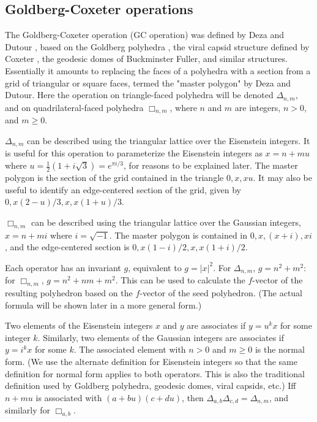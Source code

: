 \documentclass[12pt]{amsart}%
\begin{document}
\subsection{Goldberg-Coxeter operations}
The Goldberg-Coxeter operation (GC operation) was defined by Deza and Dutour
\cite{dutour}\cite{deza}, based on the Goldberg polyhedra
\cite{goldberg}\cite{hart13}, the viral capsid structure defined by Coxeter
\cite{coxeter71}, the geodesic domes of Buckminster Fuller\cite{kenner}, and
similar structures\cite{tarnai}. Essentially it amounts to replacing the faces
of a polyhedra with a section from a grid of triangular or square faces,
termed the "master polygon" by Deza and Dutour. Here the operation on
triangle-faced polyhedra will be denoted $\Delta_{n,m}$,
and on quadrilateral-faced polyhedra $\Box_{n,m}$,
where $n$ and $m$ are integers, $n > 0$, and $m \ge 0$.

$\Delta_{n,m}$ can be described using the triangular lattice over the
Eisenstein integers. It is useful for this operation to parameterize the
Eisenstein integers as $x = n + mu$ where $u = \frac{1}{2}(1 + i\sqrt 3) =
e^{\pi i/3}$, for reasons to be explained later. The master polygon is the
section of the grid contained in the triangle $0, x, xu$. It may also be useful
to identify an edge-centered section of the grid,
given by $0, x(2-u)/3, x, x(1+u)/3$.

$\Box_{n,m}$ can be described using the triangular lattice over the Gaussian
integers, $x = n + mi$ where $i = \sqrt{-1}$. The master polygon is contained
in $0,x,(x+i),xi$, and the edge-centered section is $0, x(1-i)/2, x, x(1+i)/2$.

Each operator has an invariant $g$, equivalent to $g = |x|^2$. For
$\Delta_{n,m}$, $g = n^2 + m^2$: for $\Box_{n,m}$, $g = n^2 + nm + m^2$. This
can be used to calculate the $f$-vector of the resulting polyhedron
based on the $f$-vector of the seed polyhedron. (The actual formula
will be shown later in a more general form.)

Two elements of the Eisenstein integers $x$ and $y$ are associates if
$y = u^k x$ for some integer $k$. Similarly, two elements of the Gaussian integers are
associates if $y = i^k x$ for some $k$. The associated element with $n>0$ and
$m\ge 0$ is the normal form. (We use the alternate definition for Eisenstein
integers so that the same definition for normal form applies to both operators.
This is also the traditional definition used by Goldberg polyhedra, geodesic
domes, viral capsids, etc.) Iff $n+mu$ is associated with $(a+bu)(c+du)$, then
$\Delta_{a,b}\Delta_{c,d} = \Delta_{n,m}$, and similarly for $\Box_{a,b}$.
\end{document}
